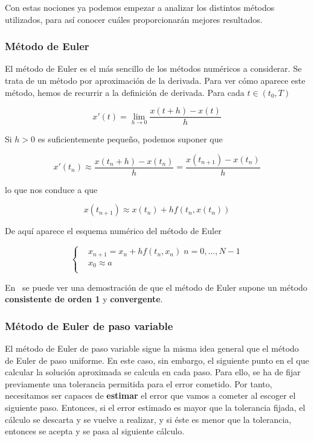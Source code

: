 Con estas nociones ya podemos empezar a analizar los distintos métodos
utilizados, para así conocer cuáles proporcionarán mejores resultados. 

\subsubsection{Método de Euler}
\label{makereference5.4.3.1}

El método de Euler es el más sencillo de los métodos numéricos a considerar. Se
trata de un método por aproximación de la derivada. Para ver cómo aparece este
método, hemos de recurrir a la definición de derivada. Para cada $t \in (t_0,T)$

\begin{equation}
		x'(t) = \lim_{h \to 0} \frac{x(t+h) - x(t)}{h} 	
\end{equation}

Si $h>0$ es suficientemente pequeño, podemos suponer que

\begin{equation}
		x'(t_n)\approx \frac{x(t_n+h) - x(t_n)}{h} = \frac{x(t_{n+1}) -
		x(t_n)}{h}	
\end{equation}

lo que nos conduce a que

\begin{equation}
		x(t_{n+1}) \approx x(t_n) + hf(t_n,x(t_n))	
\end{equation}

De aquí aparece el esquema numérico del método de Euler

\begin{equation}
		\left\{ \begin{aligned}
				& x_{n+1} = x_n + hf(t_n,x_n) \; n=0,\ldots,N-1 \\
				& x_0 \approx a \\
		\end{aligned} \right.
\end{equation}

En~\citet{ANNU} se puede ver una demostración de que el método de Euler supone
un método \textbf{consistente de orden 1} y \textbf{convergente}.

\subsubsection{Método de Euler de paso variable}
\label{makereference5.4.3.2}

El método de Euler de paso variable sigue la misma idea general que el método de
Euler de paso uniforme. En este caso, sin embargo, el siguiente punto en el que
calcular la solución aproximada se calcula en cada paso. Para ello, se ha de
fijar previamente una tolerancia permitida para el error cometido. Por tanto,
necesitamos ser capaces de \textbf{estimar} el error que vamos a cometer al
escoger el siguiente paso. Entonces, si el error estimado es mayor que la
tolerancia fijada, el cálculo se descarta y se vuelve a realizar, y si éste es
menor que la tolerancia, entonces se acepta y se pasa al siguiente cálculo.


